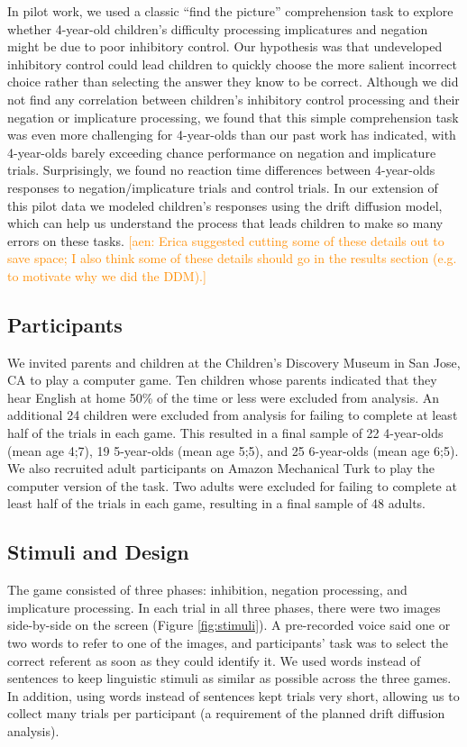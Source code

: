 \documentclass[10pt,letterpaper]{article}
\newcommand{\aen}[1]{\textcolor{DarkOrange}{[aen: #1]}}
\begin{document}
In pilot work, we used a classic ``find the picture'' comprehension task to explore whether 4-year-old children's difficulty processing implicatures and negation might be due to poor inhibitory control.  Our hypothesis was that undeveloped inhibitory control could lead children to quickly choose the more salient incorrect choice rather than selecting the answer they know to be correct.  Although we did not find any correlation between children's inhibitory control processing and their negation or implicature processing, we found that this simple comprehension task was even more challenging for 4-year-olds than our past work has indicated, with 4-year-olds barely exceeding chance performance on negation and implicature trials.  Surprisingly, we found no reaction time differences between 4-year-olds responses to negation/implicature trials and control trials. In our extension of this pilot data we modeled children's responses using the drift diffusion model, which can help us understand the process that leads children to make so many errors on these tasks.  \aen{Erica suggested cutting some of these details out to save space; I also think some of these details should go in the results section (e.g. to motivate why we did the DDM).}

\subsection{Participants}

We invited parents and children at the Children's Discovery Museum in San Jose, CA to play a computer game.  Ten children whose parents indicated that they hear English at home 50\% of the time or less were excluded from analysis.  An additional 24 children were excluded from analysis for failing to complete at least half of the trials in each game.  This resulted in a final sample of 22 4-year-olds (mean age 4;7), 19 5-year-olds (mean age 5;5), and 25 6-year-olds (mean age 6;5).  We also recruited adult participants on Amazon Mechanical Turk to play the computer version of the task.  Two adults were excluded for failing to complete at least half of the trials in each game, resulting in a final sample of 48 adults.  


\subsection{Stimuli and Design}

The game consisted of three phases: inhibition, negation processing, and implicature processing.  In each trial in all three phases, there were two images side-by-side on the screen (Figure \ref{fig:stimuli}). A pre-recorded voice said one or two words to refer to one of the images, and participants' task was to select the correct referent as soon as they could identify it. We used words instead of sentences to keep linguistic stimuli as similar as possible across the three games.  In addition, using words instead of sentences kept trials very short, allowing us to collect many trials per participant (a requirement of the planned drift diffusion analysis).  
\end{document}
